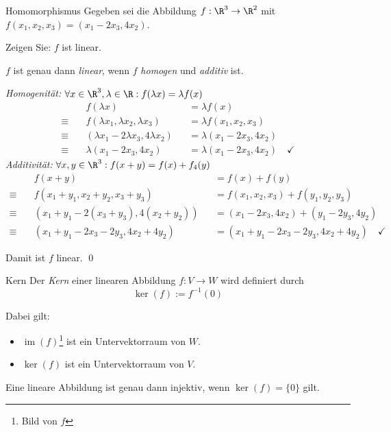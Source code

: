 \documentclass[german]{../spicker}
\newcommand{\im}{\operatorname{im}}
\begin{document}
\begin{example}{Homomorphismus}
    Gegeben sei die Abbildung $f : \R^3 \to \R^2$ mit $f(x_1, x_2, x_3) = (x_1-2x_3, 4x_2)$.

    Zeigen Sie: $f$ ist linear.

    \exampleseparator

    $f$ ist genau dann \emph{linear}, wenn $f$ \emph{homogen} und \emph{additiv} ist.

    \emph{Homogenität:} $\forall x \in \R^3, \lambda \in \R: f(\lambda  x) = \lambda  f(x)$
    $$
        \begin{aligned}
                         & f(\lambda  x)                                  &  & = \lambda  f(x)                              \\
            \equiv \quad & f(\lambda  x_1, \lambda  x_2, \lambda  x_3)    &  & = \lambda  f(x_1, x_2, x_3)                  \\
            \equiv \quad & (\lambda  x_1-2  \lambda  x_3, 4 \lambda  x_2) &  & = \lambda  (x_1-2x_3, 4x_2)                  \\
            \equiv \quad & \lambda  (x_1-2x_3, 4x_2)                      &  & = \lambda  (x_1-2x_3, 4x_2) \quad \checkmark
        \end{aligned}
    $$
    \emph{Additivität:} $\forall x, y \in \R^3: f(x + y) = f(x) + f_4(y)$
    $$
        \begin{aligned}
                         & f(x + y)                                 &  & = f(x) + f(y)                                               \\
            \equiv \quad & f(x_1 + y_1, x_2 + y_2, x_3 + y_3)       &  & = f(x_1, x_2, x_3) + f(y_1, y_2, y_3)                       \\
            \equiv \quad & (x_1 + y_1-2(x_3 + y_3), 4(x_2 + y_2))   &  & = (x_1-2x_3, 4x_2) + (y_1-2y_3, 4y_2)                       \\
            \equiv \quad & (x_1 + y_1-2 x_3 -2  y_3, 4 x_2 +4  y_2) &  & = (x_1 + y_1-2 x_3 -2  y_3, 4 x_2 +4  y_2) \quad \checkmark
        \end{aligned}
    $$

    Damit ist $f$ linear. \qed
\end{example}

\begin{defi}{Kern}
    Der \emph{Kern} einer linearen Abbildung $f : V \to W$ wird definiert durch
    $$
        \ker (f) := f^{-1}(0)
    $$

    Dabei gilt:
    \begin{itemize}
        \item $\im (f)$\footnote{Bild von $f$} ist ein Untervektorraum von $W$.
        \item $\ker (f)$ ist ein Untervektorraum von $V$.
    \end{itemize}

    Eine lineare Abbildung ist genau dann injektiv, wenn $\ker (f) = \{0\}$ gilt.
\end{defi}
\end{document}
